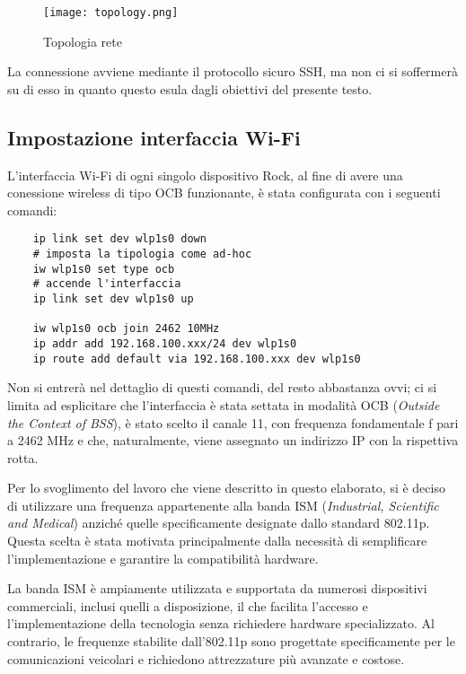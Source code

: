 \begin{figure}[h!]
    \centering
    \texttt{[image: topology.png]}
    \caption{Topologia rete}
    \label{fig:etichetta}
\end{figure}

La connessione avviene mediante il protocollo sicuro SSH, ma non ci si soffermerà su di esso in quanto questo esula dagli obiettivi del presente testo.

\subsection[Impostazione interfaccia Wi-Fi]{Impostazione interfaccia Wi-Fi}
L'interfaccia Wi-Fi di ogni singolo dispositivo Rock, al fine di avere una conessione wireless di tipo OCB funzionante, è stata configurata con i seguenti comandi:

\begin{lstlisting}
    ip link set dev wlp1s0 down
    # imposta la tipologia come ad-hoc
    iw wlp1s0 set type ocb
    # accende l'interfaccia
    ip link set dev wlp1s0 up
    
    iw wlp1s0 ocb join 2462 10MHz
    ip addr add 192.168.100.xxx/24 dev wlp1s0
    ip route add default via 192.168.100.xxx dev wlp1s0
\end{lstlisting}

Non si entrerà nel dettaglio di questi comandi, del resto abbastanza ovvi; ci si limita ad esplicitare che l'interfaccia è stata settata in modalità OCB (\textit{Outside the Context of BSS}), è stato scelto il canale 11, con frequenza fondamentale f pari a 2462 MHz e che, naturalmente, viene assegnato un indirizzo IP con la rispettiva rotta.

Per lo svoglimento del lavoro che viene descritto in questo elaborato, si è deciso di utilizzare una frequenza appartenente alla banda ISM (\textit{Industrial, Scientific and Medical}) anziché quelle specificamente designate dallo standard 802.11p. Questa scelta è stata motivata principalmente dalla necessità di semplificare l'implementazione e garantire la compatibilità hardware.

La banda ISM è ampiamente utilizzata e supportata da numerosi dispositivi commerciali, inclusi quelli a disposizione, il che facilita l'accesso e l'implementazione della tecnologia senza richiedere hardware specializzato. Al contrario, le frequenze stabilite dall'802.11p sono progettate specificamente per le comunicazioni veicolari e richiedono attrezzature più avanzate e costose.

